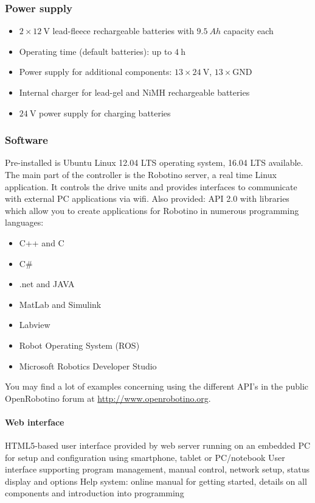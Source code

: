 \documentclass[12pt,twoside]{article}
\begin{document}
\begin{appendix}
\subsubsection{Power supply}
\begin{itemize}
  \item $2 \times \SI{12}{\volt}$ lead-fleece rechargeable batteries with
    $\SI{9.5}{Ah}$ capacity each
  \item Operating time (default batteries): up to $\SI{4}{\hour}$
\item Power supply for additional components: $13 \times \SI{24}{\volt}$,
  $13 \times \text{GND}$
\item Internal charger for lead-gel and NiMH rechargeable batteries
\item $\SI{24}{\volt}$ power supply for charging batteries
\end{itemize}

\subsubsection{Software}
Pre-installed is Ubuntu Linux 12.04 LTS operating system, 16.04 LTS available.
The main part of the controller is the Robotino server, a real time Linux
application. It controls the drive units and provides interfaces to
communicate with external PC applications via wifi. Also provided: API
2.0 with libraries which allow you to create applications for Robotino
in numerous programming languages:

\begin{itemize}
\item C++ and C
\item C\#
\item {.net} and JAVA
\item MatLab and Simulink
\item Labview
\item Robot Operating System (ROS)
\item Microsoft Robotics Developer Studio
\end{itemize}

You may find a lot of examples concerning using the different API's in
the public OpenRobotino forum at \url{http://www.openrobotino.org}.

\paragraph{Web interface}
HTML5-based user interface provided by web server running on an embedded
PC for setup and configuration using smartphone, tablet or PC/notebook
User interface supporting program management, manual control, network
setup, status display and options Help system: online manual for
getting started, details on all components and introduction into
programming


\end{appendix}
\end{document}

